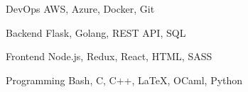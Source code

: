 

\begin{cvskills}

  \cvskill
    {DevOps} %
    {AWS, Azure, Docker, Git} %

  \cvskill
    {Backend} %
    {Flask, Golang, REST API, SQL} %

  \cvskill
    {Frontend} %
    {Node.js, Redux, React, HTML, SASS} %

  \cvskill
    {Programming} %
    {Bash, C, C++, LaTeX, OCaml, Python} %

\end{cvskills}
